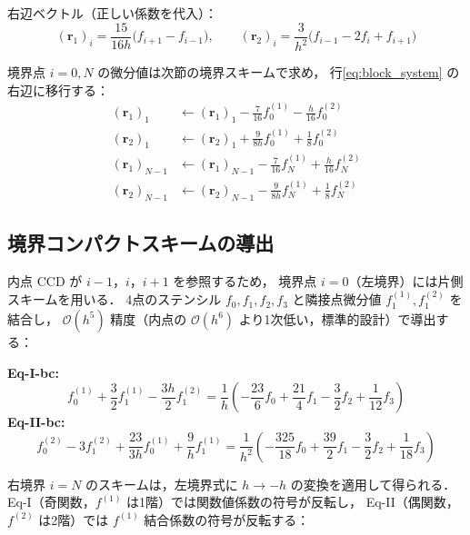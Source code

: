 \documentclass[12pt, a4paper, titlepage]{article}
\newcommand{\jp}[1]{{\normalfont\jpfont #1}}
\newcommand{\Ord}[1]{\mathcal{O}(#1)}
\newcommand{\fp}[1]{f^{(1)}_{#1}}
\newcommand{\fpp}[1]{f^{(2)}_{#1}}
\begin{document}
\jp{右辺ベクトル（正しい係数を代入）：}
\begin{equation}
  (\bm{r}_1)_i = \frac{15}{16h}\bigl(f_{i+1}-f_{i-1}\bigr),
  \qquad
  (\bm{r}_2)_i = \frac{3}{h^2}\bigl(f_{i-1}-2f_i+f_{i+1}\bigr)
  \label{eq:CCD_rhs}
\end{equation}

\jp{境界点 $i=0,N$ の微分値は次節の境界スキームで求め，
行\eqref{eq:block_system} の右辺に移行する：}
\begin{align}
  (\bm{r}_1)_1    &\leftarrow (\bm{r}_1)_1    - \tfrac{7}{16}\fp{0} - \tfrac{h}{16}\fpp{0}
  \\
  (\bm{r}_2)_1    &\leftarrow (\bm{r}_2)_1    + \tfrac{9}{8h}\fp{0} + \tfrac{1}{8}\fpp{0}
  \\
  (\bm{r}_1)_{N-1}&\leftarrow (\bm{r}_1)_{N-1} - \tfrac{7}{16}\fp{N} + \tfrac{h}{16}\fpp{N}
  \\
  (\bm{r}_2)_{N-1}&\leftarrow (\bm{r}_2)_{N-1} - \tfrac{9}{8h}\fp{N} + \tfrac{1}{8}\fpp{N}
\end{align}

\subsection{\jp{境界コンパクトスキームの導出}}

\jp{内点 CCD が $i-1$，$i$，$i+1$ を参照するため，
境界点 $i=0$（左境界）には片側スキームを用いる．
4点のステンシル $f_0, f_1, f_2, f_3$ と隣接点微分値 $\fp{1}, \fpp{1}$ を結合し，
$\Ord{h^5}$ 精度（内点の $\Ord{h^6}$ より1次低い，標準的設計）で導出する：}

\begin{tcolorbox}[mybox, title={\jp{左境界スキーム（$i=0$，$\Ord{h^5}$）}}]
\label{eq:CCD_bc_left}
\textbf{Eq-I-bc:}
\begin{equation}
  \fp{0} + \frac{3}{2}\fp{1} - \frac{3h}{2}\fpp{1}
  = \frac{1}{h}\!\left(
    -\frac{23}{6}f_0
    + \frac{21}{4}f_1
    - \frac{3}{2}f_2
    + \frac{1}{12}f_3
  \right)
  \label{eq:bc_I_left}
\end{equation}
\textbf{Eq-II-bc:}
\begin{equation}
  \fpp{0} - 3\fpp{1}
  + \frac{23}{3h}\fp{0}
  + \frac{9}{h}\fp{1}
  = \frac{1}{h^2}\!\left(
    -\frac{325}{18}f_0
    + \frac{39}{2}f_1
    - \frac{3}{2}f_2
    + \frac{1}{18}f_3
  \right)
  \label{eq:bc_II_left}
\end{equation}
\end{tcolorbox}

\jp{右境界 $i=N$ のスキームは，左境界式に $h\to-h$ の変換を適用して得られる．
Eq-I（奇関数，$\fp{}$ は1階）では関数値係数の符号が反転し，
Eq-II（偶関数，$\fpp{}$ は2階）では $\fp{}$ 結合係数の符号が反転する：}
\end{document}
